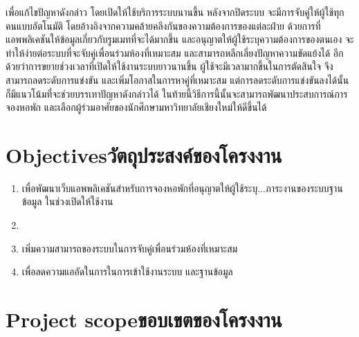 เพื่อแก้ไขปัญหาดังกล่าว  โดยเปิดให้ใช้บริการระบบนานขึ้น หลังจากปิดระบบ จะมีการจับคู่ให้ผู้ใช้ทุกคนแบบอัตโนมัติ 
โดยอ้างอิงจากความคล้ายคลึงกันของความต้องการของแต่ละฝ่าย
ด้วยการที่แอพพลิเคชันให้ข้อมูลเกี่ยวกับรูมเมทที่จะได้มากขึ้น และอนุญาตให้ผู้ใช้ระบุความต้องการของตนเอง 
จะทำให้ง่ายต่อระบบที่จะจับคู่เพื่อนร่วมห้องที่เหมาะสม และสามารถหลีกเลี่ยงปัญหาความขัดแย้งได้ 
อีกด้วยว่าการขยายช่วงเวลาที่เปิดให้ใช้งานระบบยาวนานขึ้น ผู้ใช้จะมีเวลามากขึ้นในการตัดสินใจ จึงสามารถลดระดับการแข่งขัน 
และเพิ่มโอกาสในการหาคู่ที่เหมาะสม 
แต่การลดระดับการแข่งขันลงได้นั้น ก็มีแนวโน้มที่จะช่วยบรรเทาปัญหาดังกล่าวได้ 
ในท้ายนี้วิธีการนี้นั้นจะสามารถพัฒนาประสบการณ์การจองหอพัก และเลือกผู้ร่วมอาศัยของนักศึกษามหาวิทยาลัยเชียงใหม่ให้ดีขึ้นได้

\section{\ifenglish Objectives\else วัตถุประสงค์ของโครงงาน\fi}
\begin{enumerate}
    \item เพื่อพัฒนาเว็บแอพพลิเคชันสำหรับการจองหอพักที่อนุญาตให้ผู้ใช้ระบุ...ภาระงานของระบบฐานข้อมูล ในช่วงเปิดให้ใช้งาน
    \item {}
    \item เพิ่มความสามารถของระบบในการจับคู่เพื่อนร่วมห้องที่เหมาะสม
    \item เพื่อลดความแออัดในการในการเข้าใช้งานระบบ และฐานข้อมูล
\end{enumerate}

\section{\ifenglish Project scope\else ขอบเขตของโครงงาน\fi}
